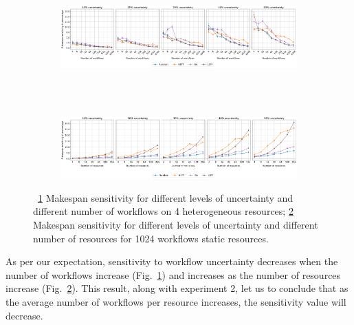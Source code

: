 \begin{landscape}
\begin{figure}[ht!]
    \centering
    \begin{subfigure}[b]{1.55\textwidth}
        \centering
        \includegraphics[width=.95\textwidth]{figures/campaign/InaccurStHeteroCampaigns_4StHeteroResourcesSens.pdf}
        \caption{}
        \label{fig:InaccurStHeteroCampaigns_4StHeteroResourcesSens}
    \end{subfigure}\\
    ~
    \begin{subfigure}[b]{1.55\textwidth}
        \includegraphics[width=.95\textwidth]{figures/campaign/InaccurStHeteroResources_StHeteroCampaignsSens.pdf}
        \caption{}
        \label{fig:InaccurStHeteroResources_StHeteroCampaignsSens}
    \end{subfigure}
    \caption{~\ref{fig:InaccurStHeteroCampaigns_4StHeteroResourcesSens} Makespan
    sensitivity for different levels of uncertainty and different number of
    workflows on 4 heterogeneous resources;
    \ref{fig:InaccurStHeteroResources_StHeteroCampaignsSens} Makespan
    sensitivity for different levels of uncertainty and different number of
    resources for 1024 workflows static resources.}
    \label{fig:inaccur_st}
\end{figure}
\end{landscape}
As per our expectation, sensitivity to workflow uncertainty decreases when the
number of workflows increase
(Fig.~\ref{fig:InaccurStHeteroCampaigns_4StHeteroResourcesSens}) and increases
as the number of resources increase
(Fig.~\ref{fig:InaccurStHeteroResources_StHeteroCampaignsSens}). This result,
along with experiment 2, let us to conclude that as the average number of
workflows per resource increases, the sensitivity value will decrease.

